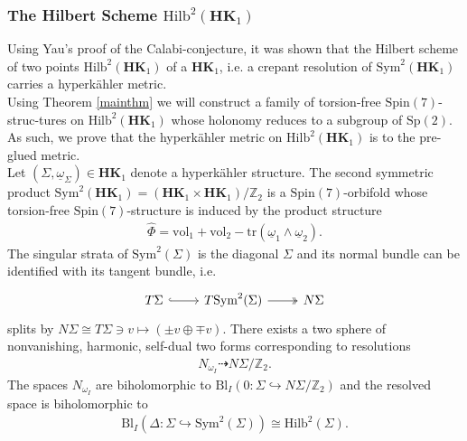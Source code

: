 \documentclass[psamsfonts]{amsart}
\theoremstyle{plain}
\theoremstyle{definition}{
\newtheorem{defi}{Definition}[section]
\newtheorem{ass}{Assumption}
\newtheorem*{nota}{Notation}}
\theoremstyle{remark}{
\newtheorem{rem}{Remark}
\newtheorem{ex}{Example}}
\theoremstyle{plain}{
\newtheorem{thm}{Theorem}[section]
\newtheorem{lem}{Lemma}[section]
\newtheorem{cor}{Corollary}[section]
\newtheorem{prop}{Proposition}[section]
\newtheorem{con}{Conjecture}[section]}
\newcommand{\m}[1]{{\mathrm{#1}}}
\newcommand{\cat}[1]{\textbf{#1}}
\begin{document}
\subsubsection{The Hilbert Scheme $\m{Hilb}^2(\cat{HK}_1)$}
\label{The Hilbert Scheme Hilb^2(HK1)}

Using Yau's proof of the Calabi-conjecture, it was shown that the Hilbert scheme of two points $\m{Hilb}^2(\cat{HK}_1)$ of a $\cat{HK}_1$, i.e. a crepant resolution of $\m{Sym}^2(\cat{HK}_1)$ carries a hyperkähler metric.\\

Using Theorem \ref{mainthm} we will construct a family of torsion-free $\m{Spin}(7)$-struc-tures on $\m{Hilb}^2(\cat{HK}_1)$ whose holonomy reduces to a subgroup of $\m{Sp}(2)$. As such, we prove that the hyperkähler metric on $\m{Hilb}^2(\cat{HK}_1)$ is  to the pre-glued metric.\\



Let $(\Sigma,\underline{\omega}_\Sigma)\in \cat{HK}_1$ denote a hyperkähler structure. The second symmetric product $\m{Sym}^2(\cat{HK}_1)=(\cat{HK}_1\times \cat{HK}_1)/\mathbb{Z}_2$ is a $\m{Spin}(7)$-orbifold whose torsion-free $\m{Spin}(7)$-structure is induced by the product structure 
\begin{align*}
    \hat{\Phi}=\m{vol}_{1}+\m{vol}_2-\m{tr}(\underline{\omega}_1\wedge\underline{\omega}_2).
\end{align*}
The singular strata of $\m{Sym}^2(\Sigma)$ is the diagonal $\Sigma$ and its normal bundle can be identified with its tangent bundle, i.e.
\begin{equation*}
\begin{tikzcd}
        T\Sigma\arrow[r,hook]&T\m{Sym}^2(\Sigma)\arrow[r,two heads]&N\Sigma
\end{tikzcd}
\end{equation*}
splits by $N\Sigma\cong T\Sigma\ni v\mapsto (\pm v\oplus\mp v)$. There exists a two sphere of nonvanishing, harmonic, self-dual two forms corresponding to resolutions 
\begin{align*}
    N_{\omega_I}\dashrightarrow N\Sigma/\mathbb{Z}_2.
\end{align*}
The spaces $N_{\omega_I}$ are biholomorphic to $\m{Bl}_I(0\colon \Sigma\hookrightarrow N\Sigma/\mathbb{Z}_2)$ and the resolved space is biholomorphic to 
\begin{align*}
    \m{Bl}_I(\Delta\colon \Sigma\hookrightarrow \m{Sym}^2(\Sigma))\cong\m{Hilb}^2(\Sigma).
\end{align*}
\end{document}
